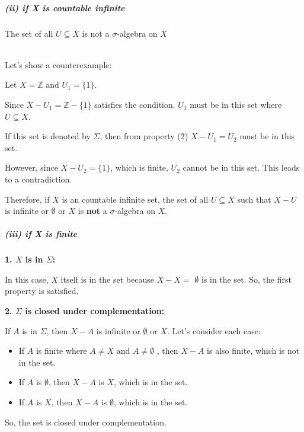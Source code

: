 \documentclass[12pt]{article}
\begin{document}
\subparagraph{(ii) if X is countable infinite}
The set of all \( U \subseteq X \) is not a \(\sigma\)-algebra on \(X\) \\ \\
\par \hspace*{1em}Let's show a counterexample: \\
\par \hspace*{1em}Let \( X = \mathbb{Z} \) and \( U_1 = \{1\} \). \\
\par \hspace*{1em}Since \( X - U_1 = \mathbb{Z} - \{1\} \) satisfies the condition. \( U_1 \) must be in this set where \( U \subseteq X \).\\
\par \hspace*{1em}If this set is denoted by \( \Sigma \), then from property (2) \( X - U_1 = U_2 \) must be in this set.\\

\par \hspace*{1em}However, since \( X - U_2 = \{1\} \), which is finite, \( U_2 \) cannot be in this set. This leads to a contradiction.\\

\par \hspace*{1em}Therefore, if \( X \) is an countable infinite set, the set of all \( U \subseteq X \) such that \( X - U \) is infinite or \(\emptyset\) or \(X\) is \textbf{not}  a \( \sigma \)-algebra on \( X \).\\

\subparagraph{(iii) if X is finite}
\par \hspace*{1em}
\par \hspace*{1em}\textbf{1. $X$ is in $\Sigma$:}

In this case, $X$ itself is in the set because $X-X=$ \(\emptyset\) is in the set. So, the first property is satisfied.

\par \hspace*{1em}\textbf{2. $\Sigma$ is closed under complementation:}

If $A$ is in $\Sigma$, then $X - A$ is infinite or $\emptyset$ or $X$. Let's consider each case:
\begin{itemize}
    \item If $A$ is finite where $A\neq X$ and  $A\neq \emptyset$ , then $X - A$ is also finite, which is not in the set.
    \item If $A$ is $\emptyset$, then $X - A$ is $X$, which is in the set.
    \item If $A$ is $X$, then $X - A$ is $\emptyset$, which is in the set.
\end{itemize}
So, the set is closed under complementation.
\end{document}
